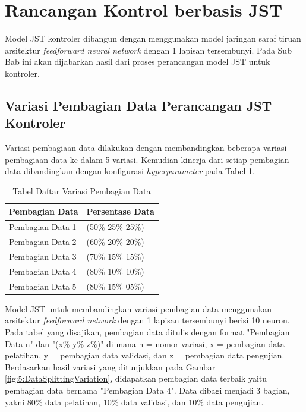 \section{Rancangan Kontrol berbasis JST}

Model JST kontroler dibangun dengan menggunakan model jaringan saraf tiruan arsitektur \textit{feedforward neural network} dengan 1 lapisan tersembunyi. Pada Sub Bab ini akan dijabarkan hasil dari proses perancangan model JST untuk kontroler.

\subsection{Variasi Pembagian Data Perancangan JST Kontroler}

Variasi pembagiaan data dilakukan dengan membandingkan beberapa variasi pembagiaan data ke dalam 5 variasi. Kemudian kinerja dari setiap pembagian data dibandingkan dengan konfigurasi \textit{hyperparameter} pada Tabel \ref{tbl:5:NeuronVariation}.\\

\begin{table}[!h]
	\caption{Tabel Daftar Variasi Pembagian Data}
	\label{tbl:5:NeuronVariation}
	\centering
	\begin{tabular}{|p{3.2cm}|p{3cm}|}
		\hline
		\textbf{Pembagian Data} & \textbf{Persentase Data} \\ \hline
		Pembagian Data 1 & (50\% 25\% 25\%) \\ \hline
		Pembagian Data 2 & (60\% 20\% 20\%) \\ \hline
		Pembagian Data 3 & (70\% 15\% 15\%) \\ \hline
		Pembagian Data 4 & (80\% 10\% 10\%) \\ \hline
		Pembagian Data 5 & (80\% 15\% 05\%) \\ \hline
	\end{tabular}
\end{table}
\vspace{2em}

Model JST untuk membandingkan variasi pembagian data menggunakan arsitektur \textit{feedforward network} dengan 1 lapisan tersembunyi berisi 10 neuron. Pada tabel yang disajikan, pembagian data ditulis dengan format "Pembagian Data n" dan "(x\% y\% z\%)" di mana n = nomor variasi, x = pembagian data pelatihan, y = pembagian data validasi, dan z = pembagian data pengujian. Berdasarkan hasil variasi yang ditunjukkan pada Gambar \ref{fig:5:DataSplittingVariation}, didapatkan pembagian data terbaik yaitu pembagian data bernama "Pembagian Data 4". Data dibagi menjadi 3 bagian, yakni 80\% data pelatihan, 10\% data validasi, dan 10\% data pengujian.

